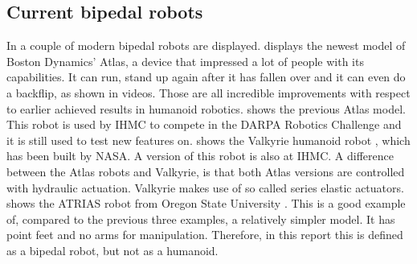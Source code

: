 \subsection{Current bipedal robots}
In  a couple of modern bipedal robots are displayed.  displays the newest model of Boston Dynamics' Atlas, a device that impressed a lot of people with its capabilities. It can run, stand up again after it has fallen over and it can even do a backflip, as shown in videos. Those are all incredible improvements with respect to earlier achieved results in humanoid robotics.  shows the previous Atlas model. This robot is used by IHMC to compete in the DARPA Robotics Challenge \cite{johnson2015team} and it is still used to test new features on.  shows the Valkyrie humanoid robot \cite{radford2015valkyrie}, which has been built by NASA. A version of this robot is also at IHMC. A difference between the Atlas robots and Valkyrie, is that both Atlas versions are controlled with hydraulic actuation. Valkyrie makes use of so called series elastic actuators.  shows the ATRIAS robot from Oregon State University \cite{ramezani2014performance}. This is a good example of, compared to the previous three examples, a relatively simpler model. It has point feet and no arms for manipulation.  Therefore, in this report this is defined as a bipedal robot, but not as a humanoid.
